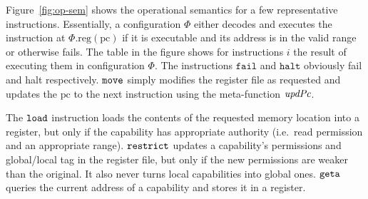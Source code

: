 \documentclass[format=acmsmall, review=true, screen=true]{acmart}
\renewcommand{\figurename}{Figure}
\newcommand{\update}[2]{[#1 \mapsto #2]}
\newcommand{\sem}[1]{\left\llbracket #1 \right\rrbracket}
\newcommand\dominique[1]{{\color{purple} \sf \footnotesize {DD: #1}}\\}
\renewcommand\dominique[1]{}
\newcommand{\var}[1]{\mathit{#1}}
\newcommand{\lv}{\var{r}}
\newcommand{\gl}{\var{g}}
\newcommand{\pcreg}{\mathrm{pc}}
\newcommand{\addr}{\var{a}}
\newcommand{\start}{\var{b}}
\newcommand{\addrend}{\var{e}}
\newcommand{\perm}{\var{perm}}
\newcommand{\permp}{\var{permPair}}
\newcommand{\stdcap}[1][(\perm,\gl)]{\left(#1,\start,\addrend,\addr \right)}
\newcommand{\plainproj}[1]{\mathrm{#1}}
\newcommand{\memreg}[1][\Phi]{#1.\plainproj{reg}}
\newcommand{\updateHeap}[3][\Phi]{#1\update{\plainproj{mem}.#2}{#3}}
\newcommand{\updateReg}[3][\Phi]{#1\update{\plainproj{reg}.#2}{#3}}
\newcommand{\plainfun}[2]{
  \ifthenelse{\equal{#2}{}}
  {\mathit{#1}}
  {\mathit{#1}(#2)}
}
\newcommand{\decodePermPair}{\plainfun{decodePermPair}}
\newcommand{\updatePcPerm}[1]{\plainfun{updPcPerm}{#1}}
\newcommand{\stdUpdatePc}[1]{\plainfun{updPc}{#1}}
\newcommand{\refreg}[1]{#1}
\newcommand{\refheap}[1]{#1}
\newcommand{\zinstr}[1]{\mathtt{#1}}
\newcommand{\fail}{\zinstr{fail}}
\newcommand{\halt}{\zinstr{halt}}
\newcommand{\oneinstr}[2]{
  \ifthenelse{\equal{#2}{}}
  {\zinstr{#1}}
  {\zinstr{#1} \; #2}
}
\newcommand{\jmp}[1]{\oneinstr{jmp}{#1}}
\newcommand{\twoinstr}[3]{
  \ifthenelse{\equal{#2#3}{}}
  {\zinstr{#1}}
  {\zinstr{#1} \; #2 \; #3}
}
\newcommand{\restricttwo}[2]{\twoinstr{restrict}{#1}{#2}}
\newcommand{\geta}[2]{\twoinstr{geta}{#1}{#2}}
\newcommand{\move}[2]{\twoinstr{move}{#1}{#2}}
\newcommand{\store}[2]{\twoinstr{store}{#1}{#2}}
\newcommand{\load}[2]{\twoinstr{load}{#1}{#2}}
\newcommand{\plainperm}[1]{\textsc{#1}}
\newcommand{\readwrite}{\plainperm{rw}}
\newcommand{\rwx}{\plainperm{rwx}}
\newcommand{\readwritel}{\plainperm{rwl}}
\newcommand{\rwlx}{\plainperm{rwlx}}
\newcommand{\plainlocality}[1]{\mathrm{#1}}
\newcommand{\local}{\plainlocality{local}}
\newcommand{\itoplassug}[1]{}
\begin{document}

\figurename~\ref{fig:op-sem}
shows the operational semantics for a
few representative instructions. Essentially, a configuration $\Phi$ either
decodes and executes the instruction at $\memreg(\pcreg)$ if it is executable
and its address is in the valid range or otherwise fails. The table in the
figure shows for instructions $i$ the result of executing them in configuration
$\Phi$. The instructions $\fail$ and $\halt$ obviously fail and halt respectively. $\move{}{}$
simply modifies the register file as requested and updates the $\pcreg$ to the
next instruction using the meta-function $\stdUpdatePc{}$.

\dominique{Follow order of figure in discussion?}
The $\load{}{}$ instruction loads the contents of the requested memory location
into a register, but only if the capability has appropriate authority (i.e.\
read permission and an appropriate range). $\restricttwo{}{}$ updates a
capability's permissions and global/local tag in the register file, but only if the new permissions are weaker than the original. 
It also never turns local
capabilities into global ones. $\geta{}{}$ queries the current address of a
capability and stores it in a register.
\end{document}
